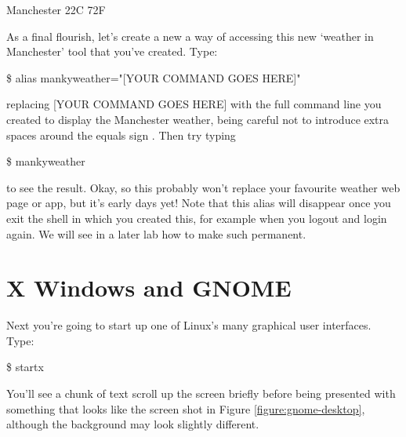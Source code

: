 \begin{ttoutenv}
   [33]Manchester 22\textdegree{}C 72\textdegree{}F
\end{ttoutenv}

As a final flourish, let's create a new a way of accessing this new `weather in Manchester' tool that you've created. Type:

\begin{ttoutenv}
\$ alias mankyweather="[YOUR COMMAND GOES HERE]"
\end{ttoutenv}

replacing [YOUR COMMAND GOES HERE] with the full command line you created to display the Manchester weather, being careful not to introduce extra spaces around the equals sign \ttout{=}. Then try typing

\begin{ttoutenv}
\$ mankyweather
\end{ttoutenv}


to see the result. Okay, so this probably won't replace your favourite weather web page or app, but it's early days yet!
Note that this alias will disappear once you exit the shell in which you created this, for example when you logout and login again. We will see in a later lab how to make such  permanent.


\section{X Windows and GNOME}

Next you're going to start up one of Linux's many graphical user interfaces. Type:

\begin{ttoutenv}
\$ startx
\end{ttoutenv}


You'll see a chunk of text scroll up the screen briefly before being presented with something that looks like the screen shot in Figure \ref{figure:gnome-desktop}, although the background may look slightly different.

